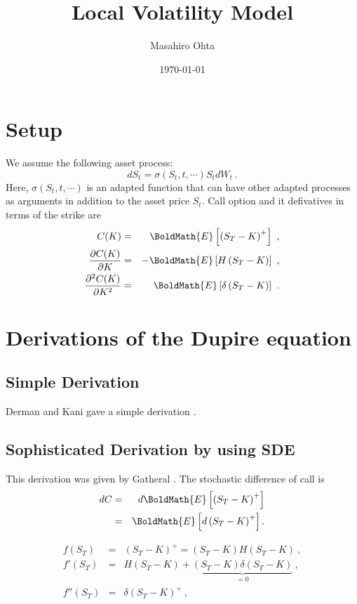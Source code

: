 \documentclass{article}
\title{Local Volatility Model}
\author{Masahiro Ohta}
\date{\today}
\begin{document}
\maketitle


\section{Setup}\label{sec:Setup}
We assume the following asset process:
\begin{equation}
	dS_t = \sigma(S_t, t, \cdots) S_t dW_t~.
\end{equation}
Here, $\sigma(S_t, t, \cdots)$ is an adapted function that can have other adapted processes as arguments in addition to the asset price $S_t$.
Call option and it defivatives in terms of the strike are
\begin{eqnarray}
	C(K) &=& \BoldMath{E}\left[\left(S_T -K\right)^+\right]~, \\
	\frac{\partial C(K)}{\partial K} &=& -\BoldMath{E}\left[H\left(S_T -K\right)\right]~,\\
	\frac{\partial^2 C(K)}{\partial K^2} &=& \BoldMath{E}\left[\delta\left(S_T -K\right)\right]~.
\end{eqnarray}

\section{Derivations of the Dupire equation}
\subsection{Simple Derivation}
Derman and Kani gave a simple derivation \cite{derman1994riding}.
\subsection{Sophisticated Derivation by using SDE}
This derivation was given by Gatheral \cite{gatheral2011volatility}.
The stochastic difference of call is
\begin{eqnarray}
	dC &=& d\BoldMath{E}\left[ \left(S_T -K\right)^+\right] \\
		 &=&  \BoldMath{E}\left[d\left(S_T -K\right)^+\right].
\end{eqnarray}

\begin{eqnarray}
	f  (S_T) &=& (S_T -K)^+ = (S_T -K) H(S_T - K)~, \\
	f' (S_T) &=& H(S_T - K) + \underbrace{(S_T -K) \delta(S_T -K)}_{=0}~, \\
	f''(S_T) &=& \delta(S_T -K)^+~,
\end{eqnarray}
\end{document}
